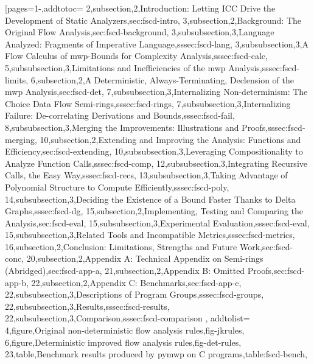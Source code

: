 [pages={1-},addtotoc={
    2,subsection,2,{Introduction: Letting ICC Drive the Development of Static Analyzers},sec:fscd-intro,
    3,subsection,2,{Background: The Original Flow Analysis},sec:fscd-background,
    3,subsubsection,3,{Language Analyzed: Fragments of Imperative Language},sssec:fscd-lang,
    3,subsubsection,3,{A Flow Calculus of mwp-Bounds for Complexity Analysis},sssec:fscd-calc,
    5,subsubsection,3,{Limitations and Inefficiencies of the mwp Analysis},sssec:fscd-limits,
    6,subsection,2,{A Deterministic, Always-Terminating, Declension of the mwp Analysis},sec:fscd-det,
    7,subsubsection,3,{Internalizing Non-determinism: The Choice Data Flow Semi-rings},sssec:fscd-rings,
    7,subsubsection,3,{Internalizing Failure: De-correlating Derivations and Bounds},sssec:fscd-fail,
    8,subsubsection,3,{Merging the Improvements: Illustrations and Proofs},sssec:fscd-merging,
    10,subsection,2,{Extending and Improving the Analysis: Functions and Efficiency},sec:fscd-extending,
    10,subsubsection,3,{Leveraging Compositionality to Analyze Function Calls},sssec:fscd-comp,
    12,subsubsection,3,{Integrating Recursive Calls, the Easy Way},sssec:fscd-recs,
    13,subsubsection,3,{Taking Advantage of Polynomial Structure to Compute Efficiently},sssec:fscd-poly,
    14,subsubsection,3,{Deciding the Existence of a Bound Faster Thanks to Delta Graphs},sssec:fscd-dg,
    15,subsection,2,{Implementing, Testing and Comparing the Analysis},sec:fscd-eval,
    15,subsubsection,3,{Experimental Evaluation},sssec:fscd-eval,
    15,subsubsection,3,{Related Tools and Incompatible Metrics},sssec:fscd-metrics,
    16,subsection,2,{Conclusion: Limitations, Strengths and Future Work},sec:fscd-conc,
    20,subsection,2,{Appendix A: Technical Appendix on Semi-rings (Abridged)},sec:fscd-app-a,
    21,subsection,2,{Appendix B: Omitted Proofs},sec:fscd-app-b,
    22,subsection,2,{Appendix C: Benchmarks},sec:fscd-app-c,
    22,subsubsection,3,{Descriptions of Program Groups},sssec:fscd-groups,
    22,subsubsection,3,{Results},sssec:fscd-results,
    22,subsubsection,3,{Comparison},sssec:fscd-comparison
}, addtolist={
    4,figure,{Original non-deterministic flow analysis rules},fig-jkrules,
    6,figure,{Deterministic improved flow analysis rules},fig-det-rules,
    23,table,{Benchmark results produced by pymwp on C programs},table:fscd-bench},
